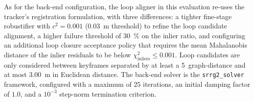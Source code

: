 As for the back-end configuration, the loop aligner in this evaluation re-uses
the tracker's registration formulation, with three differences:
a tighter fine-stage robustifier with $c^2 = 0.001$
(\SI{0.03}{\metre} threshold) to refine the loop candidate alignment,
a higher failure threshold of \SI{30}{\percent} on the inlier ratio,
and configuring an additional loop closure acceptance policy that requires
the mean Mahalanobis distance of the inlier residuals to be below
$\chi^2_{\mathrm{inliers}} \le 0.001$.
Loop candidates are only considered between keyframes separated by at least
a 5~graph-distance and at most \SI{3.00}{\metre} in Euclidean distance.
The back-end solver is the
\texttt{srrg2\_solver}~\cite{grisetti:robotics:2020} framework, configured
with a maximum of $25$ iterations, an initial damping factor of $1.0$, and
a $10^{-3}$ step-norm termination criterion.


